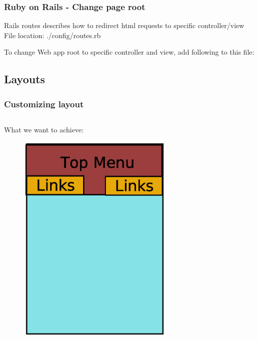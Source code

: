 \documentclass{beamer}
\theoremstyle{mystyle}
\begin{document}
\begin{frame}
  \frametitle{Ruby on Rails - Change page root}
  \begin{definition}
    Rails routes describes how to redirect html requests to specific controller/view
    File location: ./config/routes.rb
  \end{definition}
  To change Web app root to specific controller and view, add following to this file:
  \railschangeroute
\end{frame}

\subsection{Layouts}
\begin{frame}
  \frametitle{Customizing layout }
  \begin{columns}
    \begin{column}{0.5\textwidth}
      What we want to achieve:
      \begin{figure}[h]
      \centering
       \includegraphics[width = 0.7\textwidth]{./page_layout.eps}
      \end{figure}
    \end{column}
    \begin{column}{0.5\textwidth}


\end{column}
\end{columns}
\end{frame}
\end{document}
